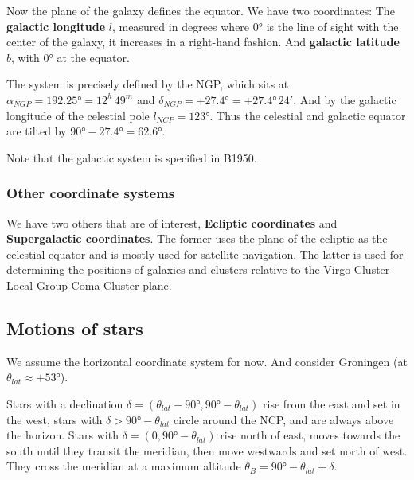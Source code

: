 \documentclass[a4paper]{article}
\begin{document}
Now the plane of the galaxy defines the equator. We have two coordinates: The \textbf{galactic longitude} $l$, measured in degrees where $0\si{\degree}$ is the line of sight with the center of the galaxy, it increases in a right-hand fashion. And \textbf{galactic latitude} $b$, with $0\si{\degree}$ at the equator.

\bigskip

The system is precisely defined by the NGP, which sits at $\alpha_{NGP}=192.25\si{\degree}=12^h\,49^m$ and $\delta_{NGP}=+27.4\si{\degree}=+27.4\si{\degree}\,24'$. And by the galactic longitude of the celestial pole $l_{NCP}=123\si{\degree}$. Thus the celestial and galactic equator are tilted by $90\si{\degree}-27.4\si{\degree}=62.6\si{\degree}$.

\bigskip 

Note that the galactic system is specified in B1950.


\subsubsection*{Other coordinate systems}

We have two others that are of interest, \textbf{Ecliptic coordinates} and \textbf{Supergalactic coordinates}. The former uses the plane of the ecliptic as the celestial equator and is mostly used for satellite navigation. The latter is used for determining the positions of galaxies and clusters relative to the Virgo Cluster-Local Group-Coma Cluster plane.

\subsection{Motions of stars}

We assume the horizontal coordinate system for now. And consider Groningen (at $\theta_{lat}\approx+53\si{\degree}$). 

\bigskip

Stars with a declination $\delta=(\theta_{lat}-90\si{\degree}, 90\si{\degree}-\theta_{lat})$ rise from the east and set in the west, stars with $\delta>90\si{\degree}-\theta_{lat}$ circle around the NCP, and are always above the horizon. Stars with $\delta=(0, 90\si{\degree}-\theta_{lat})$ rise north of east, moves towards the south until they transit the meridian, then move westwards and set north of west. They cross the meridian at a maximum altitude $\theta_B=90\si{\degree}-\theta_{lat}+\delta$.

\bigskip
\end{document}
